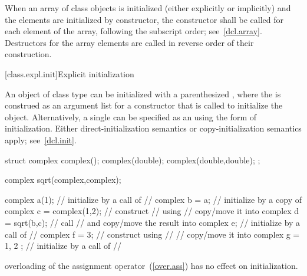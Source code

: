 \pnum
{}%
When an array of class objects is initialized
(either explicitly or implicitly) and the elements are initialized by constructor,
the constructor shall be called for each element of the array,
following the subscript order; see~\ref{dcl.array}.
\enternote
Destructors for the array elements are called in reverse order of their
construction.
\exitnote

[class.expl.init]{Explicit initialization}%
%
%

\pnum
An object of class type can be initialized with a parenthesized
,
where the
is construed as an argument list for a constructor
that is called to initialize the object.
Alternatively, a single
can be specified as an
using the
\tcode{=}
form of initialization.
Either direct-initialization semantics or copy-initialization semantics apply;
see~\ref{dcl.init}.
%
\enterexample

\begin{codeblock}
struct complex {
  complex();
  complex(double);
  complex(double,double);
};

complex sqrt(complex,complex);

complex a(1);                   // initialize by a call of
                                // 
complex b = a;                  // initialize by a copy of 
complex c = complex(1,2);       // construct 
                                // using 
                                // copy/move it into 
complex d = sqrt(b,c);          // call 
                                // and copy/move the result into 
complex e;                      // initialize by a call of
                                // 
complex f = 3;                  // construct  using
                                // 
                                // copy/move it into 
complex g = { 1, 2 };           // initialize by a call of
                                // 
\end{codeblock}
\exitexample
\enternote
{}%
overloading of the assignment operator~(\ref{over.ass})
has no effect on initialization.
\exitnote

